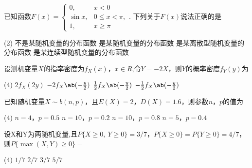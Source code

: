 \documentclass[
    newtxsf,
    twoside,openany,
]{litesolution}
\begin{document}
\begin{problem}
    已知函数$F(x)=
    \begin{cases}
        0,      & x<0\\
        \sin x, & 0\leq x<\pi,\\
        1,      & x\geq\pi
    \end{cases}$.
    下列关于$F(x)$说法正确的是
    \begin{tasks}(2)
        \task 不是某随机变量的分布函数
        \task 是某随机变量的分布函数
        \task 是某离散型随机变量的分布函数
        \task 是某连续型随机变量的分布函数
    \end{tasks}
\end{problem}
\begin{solution}

\end{solution}

\begin{problem}
    设测机变量$X$的指率密度为$f_X(x)$，$x\in R$,令$Y=-2X$，则$Y$的概率密度$f_Y(y)$为
    \begin{tasks}(4)
        \task $2f_X(2y)$
        \task $-2f_X\ab(-\frac y2)$
        \task $\frac12f_X\ab(-\frac y2)$
        \task $-\frac12f_X\ab(-\frac y2)$
    \end{tasks}
\end{problem}
\begin{solution}

\end{solution}


\begin{problem}
    已知随机变量$X\sim b(n,p)$，且$E(X)=2$，$D(X)=1.6$，则参数$n$，$p$的值为
\begin{tasks}(4)
    \task $n=4$，$p=0.5$
    \task $n=10$，$p=0.2$
    \task $n=10$，$p=0.8$
    \task $n=5$，$p=0.4$
\end{tasks}

\end{problem}
\begin{solution}

\end{solution}

\begin{problem}
    设X和Y为两随机变量,且$P\{X\geq0,\ Y\geq0\}=3/7$，$P\{X\geq0\}=P\{Y\geq0\}=4/7$，则$P\{\max(X,Y)\geq0\}=$
    \begin{tasks}(4)
        \task $1/7$
        \task $2/7$
        \task $3/7$
        \task $5/7$
    \end{tasks}
\end{problem}
\begin{solution}

\end{solution}
\end{document}
